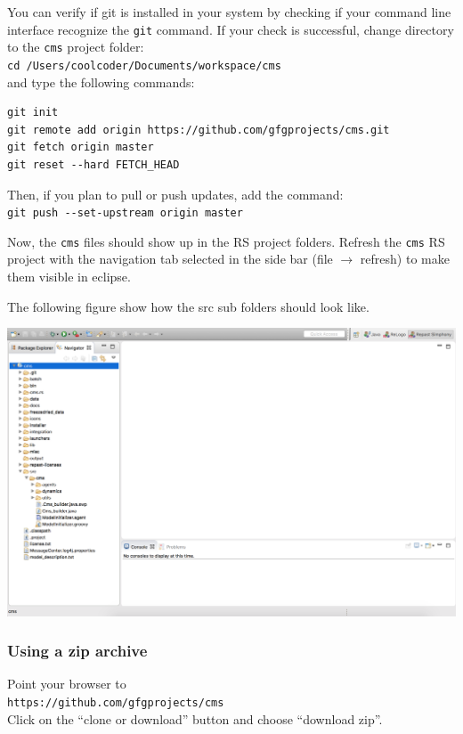 \documentclass{article}
\begin{document}
You can verify if git is installed in your system by checking if your command line interface recognize the \verb+git+ command.  
If your check is successful, change directory to the \verb+cms+ project folder:\\
\verb+cd /Users/coolcoder/Documents/workspace/cms+\\
and type the following commands:
\begin{verbatim}
git init
git remote add origin https://github.com/gfgprojects/cms.git
git fetch origin master
git reset --hard FETCH_HEAD
\end{verbatim}

Then, if you plan to pull or push updates, add the command:\\
\verb+git push --set-upstream origin master+

Now, the \verb+cms+ files should show up in the RS project folders.
Refresh the \verb+cms+ RS project with the navigation tab selected in the side bar (file $\rightarrow$ refresh) to make them visible in eclipse.

The following figure show how the src sub folders should look like.

\vskip2mm
\noindent
\includegraphics[scale=0.35]{fig_cms_rs_navigation1}

\vskip2mm

\subsubsection{Using a zip archive}

Point your browser to\\ 
\verb+https://github.com/gfgprojects/cms+\\
Click on the ``clone or download'' button and choose ``download zip''.
\end{document}
